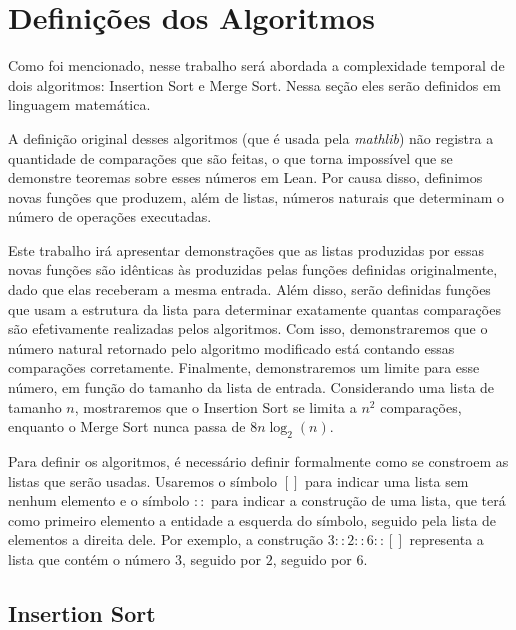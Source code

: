 \documentclass[12pt, oneside, a4paper,english,brazil]{abntex2}
\begin{document}
\inputminted{lean}{add.lean}

\chapter{Defini\c{c}\~oes dos Algoritmos}

\qquad Como foi mencionado, nesse trabalho ser\'a abordada a complexidade
temporal de dois algoritmos: Insertion Sort e Merge Sort. Nessa se\c{c}\~ao
eles ser\~ao definidos em linguagem matem\'atica.

\qquad A defini\c{c}\~ao original desses algoritmos (que \'e usada pela \textit{mathlib})
n\~ao registra a quantidade de compara\c{c}\~oes que
s\~ao feitas, o que torna imposs\'ivel que se demonstre
teoremas sobre esses n\'umeros em Lean. Por causa
disso, definimos novas fun\c{c}\~oes que produzem, al\'em de listas,
n\'umeros naturais que determinam o n\'umero de opera\c{c}\~oes executadas.

\qquad Este trabalho ir\'a apresentar demonstra\c{c}\~oes que as listas
produzidas por essas novas fun\c{c}\~oes s\~ao id\^enticas \`as produzidas pelas
fun\c{c}\~oes definidas originalmente, dado que elas receberam a mesma entrada. Al\'em
disso, ser\~ao definidas fun\c{c}\~oes que usam a estrutura da lista para
determinar exatamente quantas compara\c{c}\~oes s\~ao efetivamente realizadas
pelos algoritmos. Com isso, demonstraremos que o n\'umero natural retornado pelo
algoritmo modificado est\'a contando essas compara\c{c}\~oes corretamente. Finalmente,
demonstraremos um limite para esse n\'umero, em fun\c{c}\~ao do tamanho da lista de entrada.
Considerando uma lista de tamanho $n$, mostraremos que o Insertion Sort se limita a $n^{2}$
compara\c{c}\~oes, enquanto o Merge Sort nunca passa de $8 n \log_{2} (n)$.

\qquad Para definir os algoritmos, \'e necess\'ario definir formalmente como se
constroem as listas que ser\~ao usadas. Usaremos o s\'imbolo $[]$ para indicar
uma lista sem nenhum elemento e o s\'imbolo $::$ para indicar a constru\c{c}\~ao
de uma lista, que ter\'a como primeiro elemento a entidade a esquerda do
s\'imbolo, seguido pela lista de elementos a direita dele. Por exemplo, a
constru\c{c}\~ao $3 :: 2 :: 6 :: []$ representa a lista que cont\'em o n\'umero
$3$, seguido por $2$, seguido por $6$.

\section{Insertion Sort}
\end{document}
